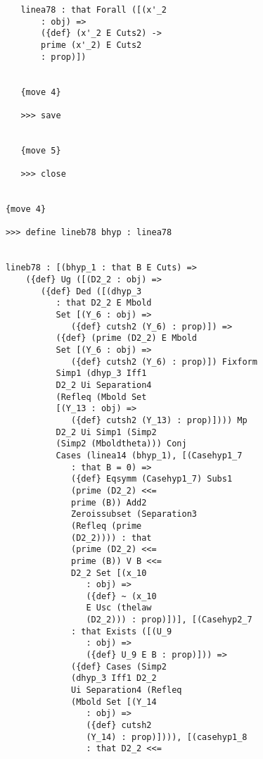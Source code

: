 \documentclass[12pt]{article}
\begin{document}
\begin{verbatim}
               linea78 : that Forall ([(x'_2 
                   : obj) => 
                   ({def} (x'_2 E Cuts2) -> 
                   prime (x'_2) E Cuts2 
                   : prop)])


               {move 4}

               >>> save


               {move 5}

               >>> close


            {move 4}

            >>> define lineb78 bhyp : linea78


            lineb78 : [(bhyp_1 : that B E Cuts) => 
                ({def} Ug ([(D2_2 : obj) => 
                   ({def} Ded ([(dhyp_3 
                      : that D2_2 E Mbold 
                      Set [(Y_6 : obj) => 
                         ({def} cutsh2 (Y_6) : prop)]) => 
                      ({def} (prime (D2_2) E Mbold 
                      Set [(Y_6 : obj) => 
                         ({def} cutsh2 (Y_6) : prop)]) Fixform 
                      Simp1 (dhyp_3 Iff1 
                      D2_2 Ui Separation4 
                      (Refleq (Mbold Set 
                      [(Y_13 : obj) => 
                         ({def} cutsh2 (Y_13) : prop)]))) Mp 
                      D2_2 Ui Simp1 (Simp2 
                      (Simp2 (Mboldtheta))) Conj 
                      Cases (linea14 (bhyp_1), [(Casehyp1_7 
                         : that B = 0) => 
                         ({def} Eqsymm (Casehyp1_7) Subs1 
                         (prime (D2_2) <<= 
                         prime (B)) Add2 
                         Zeroissubset (Separation3 
                         (Refleq (prime 
                         (D2_2)))) : that 
                         (prime (D2_2) <<= 
                         prime (B)) V B <<= 
                         D2_2 Set [(x_10 
                            : obj) => 
                            ({def} ~ (x_10 
                            E Usc (thelaw 
                            (D2_2))) : prop)])], [(Casehyp2_7 
                         : that Exists ([(U_9 
                            : obj) => 
                            ({def} U_9 E B : prop)])) => 
                         ({def} Cases (Simp2 
                         (dhyp_3 Iff1 D2_2 
                         Ui Separation4 (Refleq 
                         (Mbold Set [(Y_14 
                            : obj) => 
                            ({def} cutsh2 
                            (Y_14) : prop)]))), [(casehyp1_8 
                            : that D2_2 <<= 

\end{verbatim}
\end{document}
